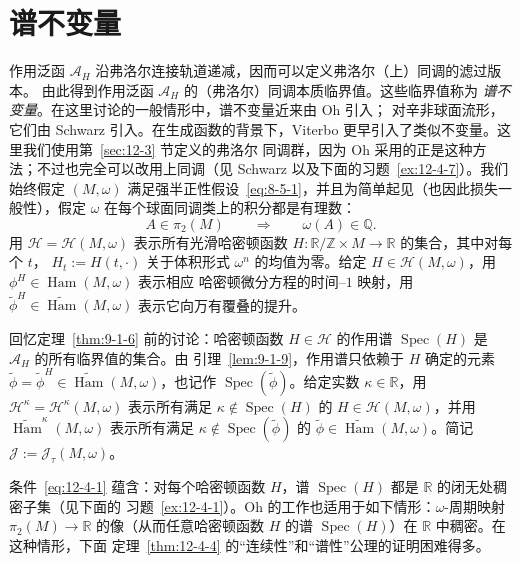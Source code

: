 
\section{谱不变量}\label{sec:12-4}

作用泛函 $\mathcal A_H$ 沿弗洛尔连接轨道递减，因而可以定义弗洛尔（上）同调的滤过版本。
由此得到作用泛函 $\mathcal A_H$ 的（弗洛尔）同调本质临界值。这些临界值称为
\emph{谱不变量}。在这里讨论的一般情形中，谱不变量近来由 Oh  引入；
对辛非球面流形，它们由 Schwarz  引入。在生成函数的背景下，Viterbo
 更早引入了类似不变量。这里我们使用第~\ref{sec:12-3} 节定义的弗洛尔
同调群，因为 Oh  采用的正是这种方法；不过也完全可以改用上同调（见
Schwarz  以及下面的习题~\ref{ex:12-4-7}）。我们始终假定 $(M,\omega)$
满足强半正性假设~\eqref{eq:8-5-1}，并且为简单起见（也因此损失一般性），假定 $\omega$
在每个球面同调类上的积分都是有理数：
\begin{equation}\label{eq:12-4-1}
  A\in\pi_2(M)\qquad\Longrightarrow\qquad\omega(A)\in\mathbb Q.
\end{equation}
用 $\mathcal H=\mathcal H(M,\omega)$ 表示所有光滑哈密顿函数
$H:\mathbb R/\mathbb Z\times M\to\mathbb R$ 的集合，其中对每个 $t$，
$H_t:=H(t,\cdot)$ 关于体积形式 $\omega^n$ 的均值为零。给定
$H\in\mathcal H(M,\omega)$，用 $\phi^H\in\operatorname{Ham}(M,\omega)$ 表示相应
哈密顿微分方程的时间--$1$ 映射，用
$\widetilde\phi^H\in\widetilde{\operatorname{Ham}}(M,\omega)$ 表示它向万有覆叠的提升。

回忆定理~\ref{thm:9-1-6} 前的讨论：哈密顿函数 $H\in\mathcal H$ 的作用谱
$\operatorname{Spec}(H)$ 是 $\mathcal A_H$ 的所有临界值的集合。由
引理~\ref{lem:9-1-9}，作用谱只依赖于 $H$ 确定的元素
$\widetilde\phi=\widetilde\phi^H\in
\widetilde{\operatorname{Ham}}(M,\omega)$，也记作
$\operatorname{Spec}(\widetilde\phi)$。给定实数 $\kappa\in\mathbb R$，用
$\mathcal H^\kappa=\mathcal H^\kappa(M,\omega)$ 表示所有满足
$\kappa\notin\operatorname{Spec}(H)$ 的 $H\in\mathcal H(M,\omega)$，并用
$\widetilde{\operatorname{Ham}}^\kappa(M,\omega)$ 表示所有满足
$\kappa\notin\operatorname{Spec}(\widetilde\phi)$ 的
$\widetilde\phi\in\widetilde{\operatorname{Ham}}(M,\omega)$。简记
$\mathcal J:=\mathcal J_\tau(M,\omega)$。

条件~\eqref{eq:12-4-1} 蕴含：对每个哈密顿函数 $H$，谱
$\operatorname{Spec}(H)$ 都是 $\mathbb R$ 的闭无处稠密子集（见下面的
习题~\ref{ex:12-4-1}）。Oh 的工作也适用于如下情形：$\omega$-周期映射
$\pi_2(M)\to\mathbb R$ 的像（从而任意哈密顿函数 $H$ 的谱
$\operatorname{Spec}(H)$）在 $\mathbb R$ 中稠密。在这种情形，下面
定理~\ref{thm:12-4-4} 的“连续性”和“谱性”公理的证明困难得多。

